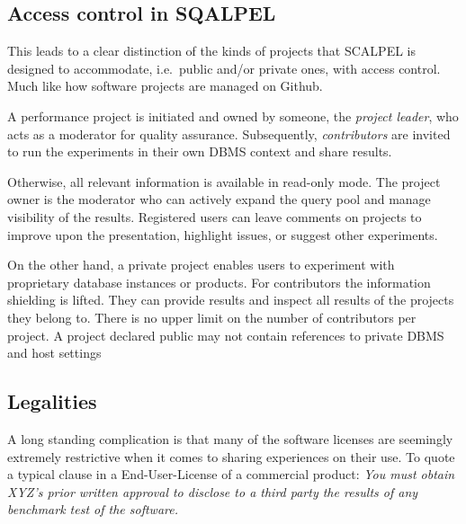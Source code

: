\documentclass{cidr-2019}
\begin{document}
\subsection{Access control in SQALPEL}
This leads to a clear distinction of the kinds of projects that {\sc
  SCALPEL} is designed to accommodate, i.e.\ public and/or private
ones, with access control.
Much like how software projects are managed on Github. 

A performance project is
initiated and owned by someone, the \emph{project leader}, who acts as
a moderator for quality assurance. Subsequently,
\emph{contributors} are invited to run the experiments in their own DBMS context and share results.

Otherwise, all relevant information is available in
read-only mode. The project owner is the moderator who can actively
expand the query pool and manage visibility of the results. Registered users can
leave comments on projects to improve upon the presentation, highlight
issues, or suggest other experiments.

On the other hand, a private project enables users to experiment with
proprietary database instances or products. For contributors the
information shielding is lifted. They can provide results and
inspect all results of the projects they belong to. There is no
upper limit on the number of contributors per project.
A project declared public may not contain references to private DBMS
and host settings

\subsection{Legalities\label{legalities}}






A long standing complication is that many of the software licenses are
seemingly extremely restrictive when it comes to sharing experiences
on their use. To quote a typical clause in a End-User-License of a
commercial product: \emph{ You must obtain XYZ's
prior written approval
  to disclose to a third party the results of any benchmark test of
  the software.}
\end{document}
